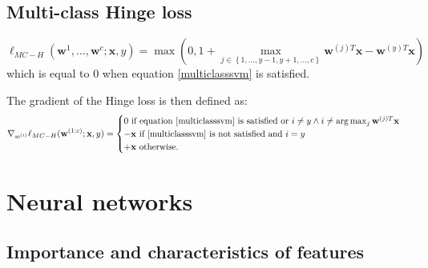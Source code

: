 \documentclass[a4paper,10pt,twoside]{article}
\begin{document}
\subsection{Multi-class Hinge loss}

\begin{equation*}
    \ell_{MC-H}(\mathbf{w}^{1},\ldots, \mathbf{w}^{c};\mathbf{x}, y)=\max(0,1+\max_{j\in\left\{1,\ldots, y-1,y+1, \ldots,c\right\}} \mathbf{w}^{(j)T}\mathbf{x}-\mathbf{w}^{(y)T}\mathbf{x})
\end{equation*}
which is equal to 0 when equation \ref{multiclasssvm} is satisfied.

The gradient of the Hinge loss is then defined as:
\begin{equation*}
    \nabla_{w^{(i)}}\ell_{MC-H}(\mathbf{w}^{(1:c)};\mathbf{x},y) = \begin{cases}
        0 \text{ if equation \ref{multiclasssvm} is satisfied or } i\neq y\land i\neq \arg\max_{j}\mathbf{w}^{(j)T}\mathbf{x}\\
        -\mathbf{x} \text{ if \ref{multiclasssvm} is not satisfied and } i=y\\
        +\mathbf{x} \text{ otherwise.}
    \end{cases}
\end{equation*}

\section{Neural networks}

\subsection{Importance and characteristics of features}
\end{document}
